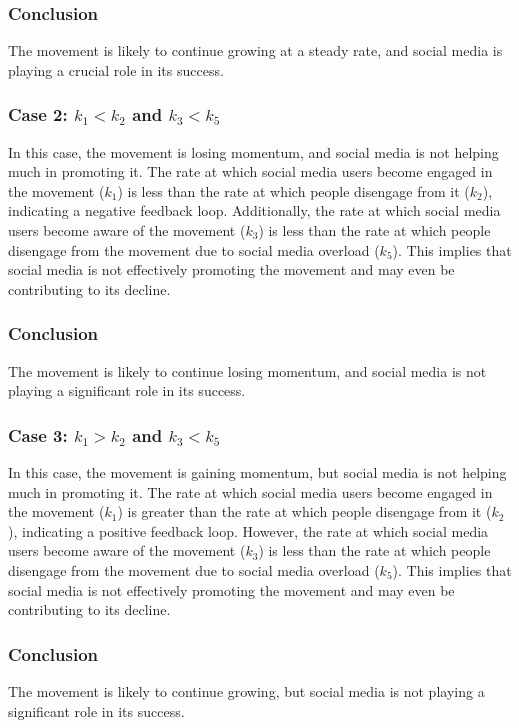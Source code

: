 \documentclass{article}
\begin{document}
    \subsubsection*{Conclusion} The movement is likely to continue growing at a steady rate, and social media is playing a crucial role in its success.

    \subsubsection*{Case 2: $k_1 < k_2$ and $k_3 < k_5$}
    In this case, the movement is losing momentum, and social media is not helping much in promoting it. The rate at which social media users become engaged in the movement ($k_1$) is less than the rate at which people disengage from it ($k_2$), indicating a negative feedback loop. Additionally, the rate at which social media users become aware of the movement ($k_3$) is less than the rate at which people disengage from the movement due to social media overload ($k_5$). This implies that social media is not effectively promoting the movement and may even be contributing to its decline.

    \subsubsection*{Conclusion} The movement is likely to continue losing momentum, and social media is not playing a significant role in its success.

    \subsubsection*{Case 3: $k_1 > k_2$ and $k_3 < k_5$}

    In this case, the movement is gaining momentum, but social media is not helping much in promoting it. The rate at which social media users become engaged in the movement ($k_1$) is greater than the rate at which people disengage from it ($k_2$), indicating a positive feedback loop. However, the rate at which social media users become aware of the movement ($k_3$) is less than the rate at which people disengage from the movement due to social media overload ($k_5$). This implies that social media is not effectively promoting the movement and may even be contributing to its decline.

    \subsubsection*{Conclusion} The movement is likely to continue growing, but social media is not playing a significant role in its success.
\end{document}
